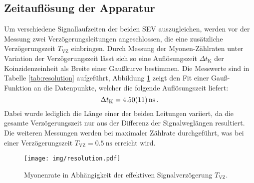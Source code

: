 \subsection{Zeitauflösung der Apparatur}
\label{subsec:zeitaufloesung}
Um verschiedene Signallaufzeiten der beiden SEV auszugleichen, werden vor der
Messung zwei Verzögerungsleitungen angeschlossen, die eine zusätzliche
Verzögerungszeit $T_\text{VZ}$ einbringen.
Durch Messung der Myonen-Zählraten unter Variation der Verzögerungszeit
lässt sich so eine Auflösungszeit $\Delta t_\text{K}$ der Koinzidenzeinheit
als Breite einer Gaußkurve bestimmen.
Die Messwerte sind in Tabelle \ref{tab:resolution} aufgeführt, Abbildung
\ref{fig:resolution} zeigt den Fit einer Gauß-Funktion an die Datenpunkte,
welcher die folgende Auflösungszeit liefert:
\begin{equation*}
    \Delta t_\text{K} = \SI{4.50+-0.11}{\nano \second}\,.
\end{equation*}
Dabei wurde lediglich die Länge einer der beiden Leitungen variiert, da die
gesamte Verzögerungszeit nur aus der Differenz der Signalweglängen resultiert.
Die weiteren Messungen werden bei maximaler Zählrate durchgeführt, was bei
einer Verzögerungszeit $T_\text{VZ} = \SI{0.5}{\nano \second}$ erreicht wird.
\begin{figure}[htb]
    \centering
    \texttt{[image: img/resolution.pdf]}
    \caption{
        Myonenrate in Abhängigkeit der effektiven Signalverzögerung
        $T_\text{VZ}$.
    }
    \label{fig:resolution}
\end{figure}
